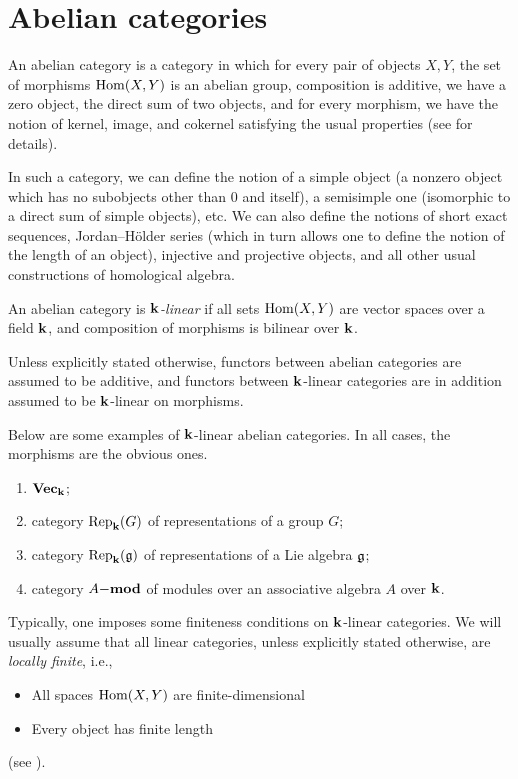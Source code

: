 \section{Abelian categories}\label{s:abelian}
\begin{definition}\label{d:abelian}
  An abelian category is a category in which for every pair of objects $X,Y$,
  the set of morphisms $\Hom(X,Y)$ is an abelian group, composition is
  additive, we have a zero object, the direct sum of two objects, and for every
  morphism, we have the notion of kernel, image, and cokernel satisfying the
  usual properties (see \cite[Section~1.3]{etingof-fusion} for details).
\end{definition}
In such a category, we can define the notion of a simple object (a nonzero
object which has no subobjects other than $0$ and itself), a semisimple one
(isomorphic to a direct sum of simple objects), etc. We can also define the
notions of short exact sequences, Jordan--H\"older series (which in turn allows
one to define the notion of the length of an object), injective and projective
objects, and all other usual constructions of homological algebra.

An abelian category is
\emph{$\kk$-linear} if all sets
$\Hom(X,Y)$ are vector spaces over a field $\kk$, and composition of morphisms
is bilinear over $\kk$.

Unless explicitly stated otherwise, functors between abelian categories are
assumed to be additive, and functors between $\kk$-linear categories are in
addition assumed to be $\kk$-linear on morphisms.


\begin{example}\label{x:linear-abelian-cats}
  Below are some examples of $\kk$-linear abelian categories. In all cases,
  the morphisms are the obvious ones.
  \begin{enumerate}
    \item $\vect_\kk$;
    \item category $\Rep_\kk(G)$ of representations of a group $G$;
    \item category $\Rep_\kk(\g)$ of representations of a Lie algebra $\g$;
    \item category $A\mod$ of modules over an associative algebra $A$
      over $\kk$.
  \end{enumerate}
\end{example}

Typically, one imposes some finiteness conditions on $\kk$-linear
categories. We will usually assume that all linear categories, unless
explicitly stated otherwise, are
\emph{locally finite}, i.e.,
\begin{itemize}
  \item All spaces $\Hom(X,Y)$ are finite-dimensional
  \item Every object has finite length
\end{itemize}
(see \cite[Section 1.8]{etingof-fusion}).

